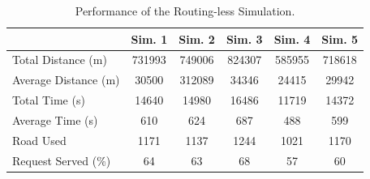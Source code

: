 \begin{table}[h]
	\centering
	\begin{tabular}{ |p{3.7cm}|c|c|c|c|c|}
		& Sim. 1 & Sim. 2 & Sim. 3 & Sim. 4 & Sim. 5 \\
		\hline
		Total Distance (m)     &731993& 749006   & 824307 & 585955& 718618 \\
		Average Distance (m)  &30500 & 312089  & 34346 & 24415& 29942\\
		Total Time (s)         &14640& 14980  & 16486 & 11719& 14372\\
		Average Time (s)      & 610& 624   & 687 & 488& 599\\
		Road Used 				&1171&1137&1244&1021& 1170\\
		Request Served  (\%)&64 & 63   & 68 & 57&60 \\
	\end{tabular}

	\caption{Performance of the Routing-less Simulation.  }
	\label{tab:routingless_simu_performance}   
\end{table}




